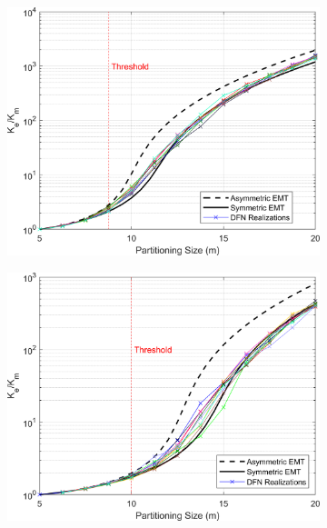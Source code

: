 \documentclass[Supplementary.tex]{subfiles}
\begin{document}
\begin{figure}[ht]
    \centering
    \begin{subfigure}{0.3\textwidth}
        \includegraphics[width=\textwidth]{FSU/Plot_FSU_Case_01_nohead.png}
        \label{fig:FSU_1}
    \end{subfigure}
    \begin{subfigure}{0.3\textwidth}
        \includegraphics[width=\textwidth]{FSU/Plot_FSU_Case_02_nohead.png}
        \label{fig:FSU_2}
    \end{subfigure}
    \begin{subfigure}{0.3\textwidth}

\end{subfigure}
\end{figure}
\end{document}

